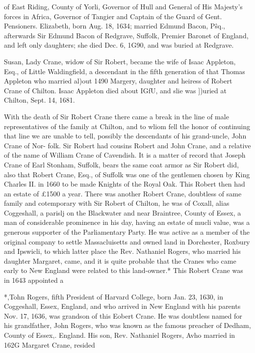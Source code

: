 \documentclass{book}
\begin{document}
of East Riding, County of Yorli, Governor of Hull and General 
of His Majesty's forces in Africa, Governor of Tangier and 
Captain of the Guard of Gent. Pensioners. Elizabeth, born Aug. 
18, 1634; married Edmund Bacon, P\^sq., afterwards Sir Edmund 
Bacon of Redgrave, Suffolk, Premier Baronet of England, and 
left only daughters; she died Dec. 6, 1G90, and was buried at 
Redgrave. 

Susan, Lady Crane, widow of Sir Robert, became the wife of 
Isaac Appleton, Esq., of Little Waldingfield, a descendant in the 
fifth generation of that Thomas Appleton who married al)out 1490 
Margery, daughter and heiress of Robert Crane of Chilton. 
Isaac Appleton died about IGfU, and slie was ])uried at Chilton, 
Sept. 14, 1681. 

With the death of Sir Robert Crane there came a break in the 
line of male representatives of the family at Chilton, and to 
wliom fell the honor of continuing that line we are unable to tell, 
possibly the descendants of his grand-uncle, John Crane of Nor- 
folk. Sir Robert had cousins Robert and John Crane, and a 
relative of the name of William Crane of Cavendish. It is a 
matter of record that Joseph Crane of Earl Stonham, Suffolk, 
bears the same coat armor as Sir Robert did, also that Robert 
Crane, Esq., of Suffolk was one of the gentlemen chosen by 
King Charles II. in 1660 to be made Knights of the Royal Oak. 
This Robert then had an estate of £1500 a year. There was 
another Robert Crane, doubtless of same family and cotemporary 
with Sir Robert of Chilton, he was of Coxall, alias Coggeshall, a 
parislj on the Blackwater and near Braintree, County of Essex, a 
man of considerable prominence in his day, having an estate of 
mucli value, was a generous supporter of the Parliamentary 
Party. He was active as a member of the original company to 
settle Massacluisetts and owned land in Dorchester, Roxbury and 
Ipswicli, to which latter place the Rev. Nathaniel Rogers, who 
married his daughter Margaret, came, and it is quite probable 
that the Cranes who came early to New England were related to 
this land-owner.* This Robert Crane was in 1643 appointed a 



*,Tohn Rogers, fifth President of Harvard College, born Jan. 23, 1630, 
in Coggeshall, Essex, England, and who arrived in New England with 
his parents Nov. 17, 1636, was grandson of this Eobert Crane. He was 
doubtless named for his grandfather, John Rogers, who was known as 
the famous preacher of Dedham, County of Essex,. England. His son, 
Rev. Nathaniel Rogers, Avho married in 162G Margaret Crane, resided 
\end{document}
